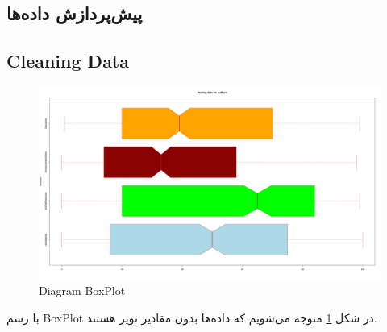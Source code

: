 \documentclass{article}
\begin{document}
\begin{large}
        \newpage
        \section{پیش‌پردازش داده‌ها}
        \subsection{Cleaning Data}
        
        \begin{figure}[h]
            \centering
            \includegraphics[width=1\textwidth]{images/boxplot.png}
            \caption{Diagram BoxPlot}
            \label{fig:boxplot}
        \end{figure}
        
        با رسم BoxPlot در شکل \ref{fig:boxplot} متوجه می‌شویم که داده‌ها بدون مقادیر نویز هستند.
\end{large}

	 
\end{document}
